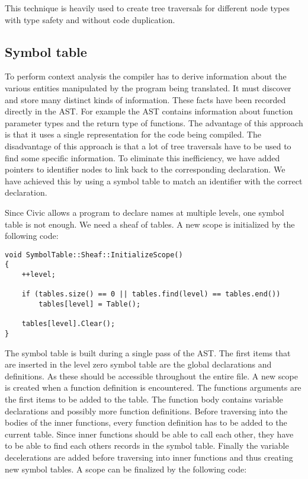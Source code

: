 \documentclass[12pt]{article}
\begin{document}
This technique is heavily used to create tree traversals for different node types with type safety and without code duplication.

\subsection{Symbol table}

To perform context analysis the compiler has to derive information about the various entities manipulated by the program being translated. It must discover and store many distinct kinds of information. These facts have been recorded directly in the AST. For example the AST contains information about function parameter types and the return type of functions. The advantage of this approach is that it uses a single representation for the code being compiled. The disadvantage of this approach is that a lot of tree traversals have to be used to find some specific information. To eliminate this inefficiency, we have added pointers to identifier nodes to link back to the corresponding declaration. We have achieved this by using a symbol table to match an identifier with the correct declaration.

Since Civic allows a program to declare names at multiple levels, one symbol table is not enough. We need a sheaf of tables. A new scope is initialized by the following code:

\begin{lstlisting}
void SymbolTable::Sheaf::InitializeScope()
{
	++level;

	if (tables.size() == 0 || tables.find(level) == tables.end())
		tables[level] = Table();
	
	tables[level].Clear();
}
\end{lstlisting}

The symbol table is built during a single pass of the AST. The first items that are inserted in the level zero symbol table are the global declarations and definitions. As these should be accessible throughout the entire file. A new scope is created when a function definition is encountered. The functions arguments are the first items to be added to the table. The function body contains variable declarations and possibly more function definitions. Before traversing into the bodies of the inner functions, every function definition has to be added to the current table. Since inner functions should be able to call each other, they have to be able to find each others records in the symbol table. Finally the variable decelerations are added before traversing into inner functions and thus creating new symbol tables. A scope can be finalized by the following code:
\end{document}
